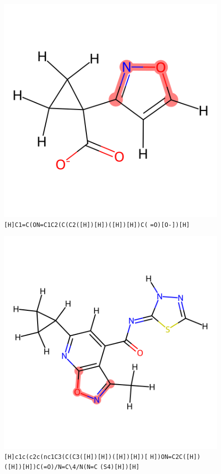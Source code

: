 \documentclass{article}
\begin{document}
\begin{figure}[ht]
\centering
    \includegraphics{mol02.png}
\cprotect\caption{\verb|[H]C1=C(ON=C1C2(C(C2([H])[H])([H])[H])C(| \verb|=O)[O-])[H]| }
\end{figure}

\begin{figure}[ht]
\centering
    \includegraphics{mol03.png}
\cprotect\caption{\verb|[H]c1c(c2c(nc1C3(C(C3([H])[H])([H])[H])[| \verb|H])ON=C2C([H])([H])[H])C(=O)/N=C\4/N(N=C| \verb|(S4)[H])[H]| }
\end{figure}
\end{document}
